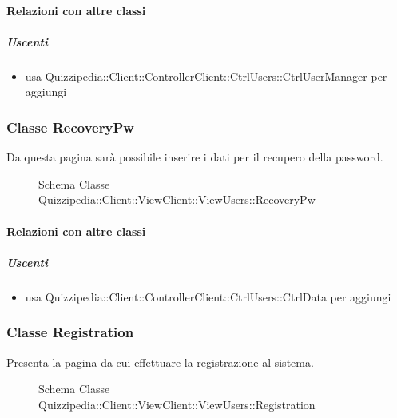 \paragraph{Relazioni con altre classi}
\subparagraph{Uscenti}
\begin{itemize}
\item usa Quizzipedia::Client::ControllerClient::CtrlUsers::CtrlUserManager per aggiungi
\end{itemize}
\subsubsection{Classe RecoveryPw}
Da questa pagina sarà possibile inserire i dati per il recupero della password.
\begin{figure}[H]
\centering
\noindent{}
\caption[Schema Classe RecoveryPw]{Schema Classe Quizzipedia::Client::ViewClient::ViewUsers::RecoveryPw}
\end{figure}
\paragraph{Relazioni con altre classi}
\subparagraph{Uscenti}
\begin{itemize}
\item usa Quizzipedia::Client::ControllerClient::CtrlUsers::CtrlData per aggiungi
\end{itemize}
\subsubsection{Classe Registration}
Presenta la pagina da cui effettuare la  registrazione al sistema.
\begin{figure}[H]
\centering
\noindent{}
\caption[Schema Classe Registration]{Schema Classe Quizzipedia::Client::ViewClient::ViewUsers::Registration}
\end{figure}
